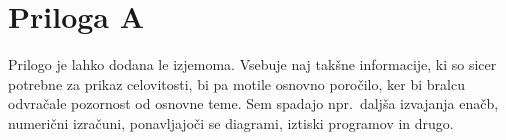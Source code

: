 \chapter{Priloga A}\label{cha:priloga}
Prilogo je lahko dodana le izjemoma. Vsebuje naj takšne informacije, ki so sicer potrebne za prikaz celovitosti, bi pa motile osnovno poročilo, ker bi bralcu odvračale pozornost od osnovne teme. Sem spadajo npr.\ daljša izvajanja enačb, numerični izračuni, ponavljajoči se diagrami, iztiski programov in drugo.